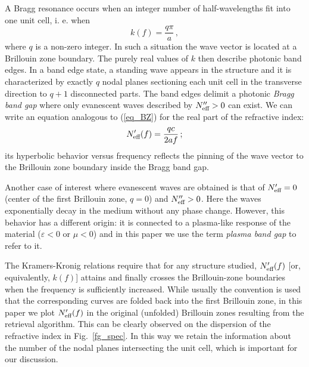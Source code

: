 \documentclass[letterpaper,12pt]{report}
\begin{document}
A Bragg resonance occurs when an integer number of half-wavelengths fit into one unit cell, i. e.  when
\begin{equation}\label{eq_BZ}
k(f) = \frac{q \pi}{a}\,,
\end{equation}
where $q$ is a non-zero integer. In such a situation the wave vector is located at a
Brillouin zone boundary. The purely real values of $k$ then describe photonic band edges.
In a band edge state, a standing wave appears in the structure and it is characterized by
exactly $q$ nodal planes sectioning each unit cell in the transverse direction to $q+1$
disconnected parts. The band edges delimit a photonic {\itshape Bragg band gap} where
only evanescent waves described by $N_{\text{eff} }''>0$ can exist.
We can write an equation analogous to (\ref{eq_BZ}) for the real part of the refractive
index:
\begin{equation}\label{eq_BZN}
N_{\text{eff} }'(f) = \frac{q c}{2 a f}\,;
\end{equation}
its hyperbolic behavior versus frequency reflects the pinning of the wave vector to the
Brillouin zone boundary inside the Bragg band gap.

Another case of interest where evanescent waves are obtained is that of $N_{\text{eff} }' = 0$
(center of the first Brillouin zone, $q=0$) and $N_{\text{eff} }''>0$. Here the waves exponentially
decay in the medium without any phase change. However, this behavior has a different
origin: it is connected to a plasma-like response of the material ($\varepsilon<0$ or
$\mu<0$) and in this paper we use the term \textit{plasma band gap} to refer to it.

The Kramers-Kronig relations require that for any structure studied, $N_{\text{eff} }'(f)$ [or,
equivalently, $k(f)$] attains and finally crosses the Brillouin-zone boundaries when the
frequency is sufficiently increased. While usually the convention is used that the
corresponding curves are folded back into the first Brillouin zone, in this paper we plot
$N_{\text{eff} }'(f)$ in the original (unfolded) Brillouin zones resulting from the retrieval
algorithm. This can be clearly observed on the dispersion of the refractive index in
Fig.\ \ref{fg_spec}. In this way we retain the information about the number of the nodal
planes intersecting the unit cell, which is important for our discussion.
\end{document}
